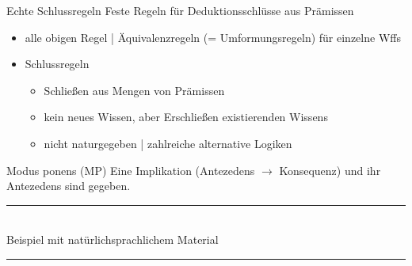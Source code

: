 \begin{frame}
  {Echte Schlussregeln}
  \onslide<+->
  \onslide<+->
  Feste Regeln für \alert{Deduktionsschlüsse aus Prämissen}\\
  \Halbzeile
  \begin{itemize}[<+->]
    \item alle obigen Regel | \alert{Äquivalenzregeln} (= Umformungsregeln) für einzelne Wffs
    \item Schlussregeln
      \begin{itemize}[<+->]
        \item Schließen aus \alert{Mengen von Prämissen}
        \item kein neues Wissen, aber \alert{Erschließen existierenden Wissens}
        \item nicht naturgegeben | zahlreiche \alert{alternative Logiken}
      \end{itemize}
  \end{itemize}
\end{frame}

\begin{frame}
  {Modus ponens (MP)}
  \onslide<+->
  \onslide<+->
  Eine \alert{Implikation} (Antezedens $\rightarrow$ Konsequenz) und \alert{ihr Antezedens} sind gegeben.\\
  \onslide<+->
  \Zeile
  \rule{3em}{0em}\\
  \Doppelzeile 
  \onslide<+->
  Beispiel mit natürlichsprachlichem Material\\
  \Zeile
  \rule{3em}{0em}
\end{frame}

